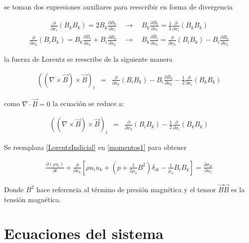\noindent se toman dos expresiones auxiliares para reescribir en forma de divergencia


    \begin{eqnarray}
    \frac{\partial}{\partial x_{i}}(B_{k}B_{k}) = 2B_{k}\frac{\partial B_{k}}{\partial x_{i}}\quad\longrightarrow\quad \boxed{B_{k}\frac{\partial B_{k}}{\partial x_{i}} = \frac{1}{2}\frac{\partial}{\partial x_{i}}(B_{k}B_{k})}
    \end{eqnarray}
    \begin{eqnarray}
    \frac{\partial}{\partial x_{k}}(B_{i}B_{k}) = B_{k}\frac{\partial B_{i}}{\partial x_{k}} + B_{i}\frac{\partial B_{k}}{\partial x_{k}} \quad\longrightarrow\quad \boxed{B_{k}\frac{\partial B_{i}}{\partial x_{k}}=\frac{\partial}{\partial x_{k}}(B_{i}B_{k})-B_{i}\frac{\partial B_{k}}{\partial x_{k}}}
    \end{eqnarray}

\noindent la fuerza de Lorentz se reescribe de la siguiente manera

\begin{eqnarray}
\left((\nabla\times\vec{B})\times\vec{B}\right)_{i} &=& \frac{\partial}{\partial x_{k}}(B_{i}B_{k})-B_{i}\frac{\partial B_{k}}{\partial x_{k}}-\frac{1}{2}\frac{\partial}{\partial x_{i}}(B_{k}B_{k})\nonumber 
\end{eqnarray}

\noindent como $\nabla\cdot\vec{B} = 0$ la ecuación se reduce a:

\begin{eqnarray}
\label{LorentzIndicial}
\left((\nabla\times\vec{B})\times\vec{B}\right)_{i} &=& \frac{\partial}{\partial x_{k}}(B_{i}B_{k})-\frac{1}{2}\frac{\partial}{\partial x_{i}}(B_{k}B_{k}) 
\end{eqnarray}

Se reemplaza \eqref{LorentzIndicial} en \eqref{momentos1} para obtener

\begin{eqnarray}
\label{LFMS}
\boxed{\frac{\partial(\rho u_{i})}{\partial t}+\frac{\partial}{\partial x_{k}}\left[\rho u_{i}u_{k}+\left(p+\frac{1}{2\mu_{o}}B^{2}\right)\delta_{ik}-\frac{1}{\mu_{o}}B_{i}B_{k}\right] = \frac{\partial \sigma_{ik}}{\partial x_{k}}}
\end{eqnarray}

Donde $B^{2}$ hace referencia al término de presión magnética y el tensor $\vec{B}\vec{B}$ es la tensión magnética. 

\section{Ecuaciones del sistema}

